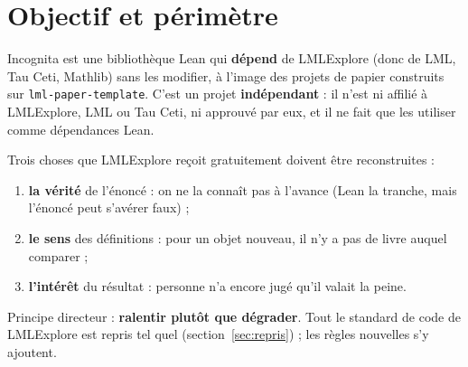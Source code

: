 \documentclass[11pt,a4paper]{article}
\newcommand{\proj}{\textsf{Incognita}}
\newcommand{\lmlx}{\textsf{LMLExplore}}
\begin{document}
\section{Objectif et périmètre}

\proj{} est une bibliothèque Lean qui \textbf{dépend} de \lmlx{} (donc de LML, Tau Ceti, Mathlib)
sans les modifier, à l'image des projets de papier construits sur \texttt{lml-paper-template}.
C'est un projet \textbf{indépendant} : il n'est ni affilié à \lmlx{}, LML ou Tau Ceti, ni approuvé
par eux, et il ne fait que les utiliser comme dépendances Lean.

\begin{center}
\end{center}

Trois choses que \lmlx{} reçoit gratuitement doivent être reconstruites :
\begin{enumerate}
\item \textbf{la vérité} de l'énoncé : on ne la connaît pas à l'avance (Lean la tranche, mais
  l'énoncé peut s'avérer faux) ;
\item \textbf{le sens} des définitions : pour un objet nouveau, il n'y a pas de livre auquel comparer ;
\item \textbf{l'intérêt} du résultat : personne n'a encore jugé qu'il valait la peine.
\end{enumerate}

Principe directeur : \textbf{ralentir plutôt que dégrader}. Tout le standard de code de \lmlx{} est
repris tel quel (section~\ref{sec:repris}) ; les règles nouvelles s'y ajoutent.
\end{document}
